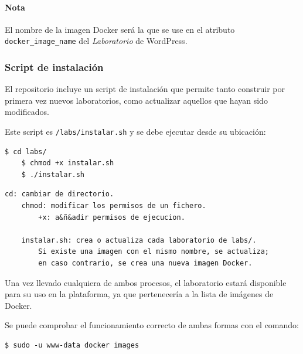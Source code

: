 \begin{appendices}
                    \paragraph{Nota}

                        El nombre de la imagen Docker será la que se use en el atributo \texttt{docker\_image\_name} del \textit{Laboratorio} de WordPress.

                \subsubsection{Script de instalación}

                    El repositorio incluye un script de instalación que permite tanto construir por primera vez nuevos laboratorios, como actualizar aquellos que hayan sido modificados.

                    Este script es \texttt{/labs/instalar.sh} y se debe ejecutar desde su ubicación:
                    \\

                    \begin{lstlisting}[style=bash_style]
    $ cd labs/
    $ chmod +x instalar.sh
    $ ./instalar.sh
                    \end{lstlisting}

                    \begin{lstlisting}[style=comment_style]
    cd: cambiar de directorio.
    chmod: modificar los permisos de un fichero.
        +x: a&ñ&adir permisos de ejecucion.

    instalar.sh: crea o actualiza cada laboratorio de labs/.
        Si existe una imagen con el mismo nombre, se actualiza;
        en caso contrario, se crea una nueva imagen Docker.

                    \end{lstlisting}

                    Una vez llevado cualquiera de ambos procesos, el laboratorio estará disponible para su uso en la plataforma, ya que pertenecería a la lista de imágenes de Docker.

                    Se puede comprobar el funcionamiento correcto de ambas formas con el comando:
                    \\

                    \begin{lstlisting}[style=bash_style]
    $ sudo -u www-data docker images
                    \end{lstlisting}


\end{appendices}
